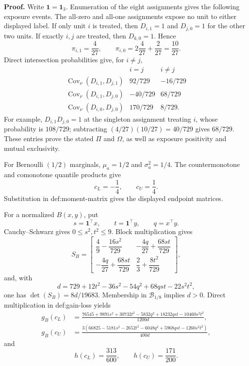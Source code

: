 \textbf{Proof.}
Write \(\mathbf1=\mathbf1_3\).  Enumeration of the eight assignments gives the following exposure events.  The all-zero and all-one assignments expose no unit to either displayed label.  If only unit \(i\) is treated, then \(D_{i,1}=1\) and \(D_{j,0}=1\) for the other two units.  If exactly \(i,j\) are treated, then \(D_{k,0}=1\).  Hence
\[
\pi_{i,1}=\frac4{27},
\qquad
\pi_{i,0}=2\frac4{27}+\frac2{27}=\frac{10}{27}.
\]
Direct intersection probabilities give, for \(i\ne j\),
\[
\begin{array}{c|cc}
&i=j&i\ne j\\ \hline
\operatorname{Cov}_{\nu}(D_{i,1},D_{j,1})&92/729&-16/729\\
\operatorname{Cov}_{\nu}(D_{i,1},D_{j,0})&-40/729&68/729\\
\operatorname{Cov}_{\nu}(D_{i,0},D_{j,0})&170/729&8/729.
\end{array}
\]
For example, \(D_{i,1}D_{j,0}=1\) at the singleton assignment treating \(i\), whose probability is \(108/729\); subtracting \((4/27)(10/27)=40/729\) gives \(68/729\).  These entries prove the stated \(\Pi\) and \(\Omega\), as well as exposure positivity and mutual exclusivity.

For Bernoulli \((1/2)\) marginals, \(\mu_a=1/2\) and \(\sigma_a^2=1/4\).  The countermonotone and comonotone quantile products give
\[
c_L=-\frac14,
\qquad
c_U=\frac14.
\]
Substitution in def:moment-matrix gives the displayed endpoint matrices.

For a normalized \(B(x,y)\), put
\[
s=\mathbf1^{\top}x,
\qquad
t=\mathbf1^{\top}y,
\qquad
q=x^{\top}y.
\]
Cauchy--Schwarz gives \(0\le s^2,t^2\le9\).  Block multiplication gives
\[
S_B=
\begin{bmatrix}
\dfrac49-\dfrac{16s^2}{729}&-\dfrac{4q}{27}+\dfrac{68st}{729}\\
-\dfrac{4q}{27}+\dfrac{68st}{729}&\dfrac23+\dfrac{8t^2}{729}
\end{bmatrix},
\]
and, with
\[
d=729+12t^2-36s^2-54q^2+68qst-22s^2t^2,
\]
one has \(\det(S_B)=8d/19683\).  Membership in \(\mathcal B_{1/8}\) implies \(d>0\).  Direct multiplication in def:gain-loss yields
\[
\begin{aligned}
g_B(c_L)
&=\frac{76545+9891s^2+30732t^2-5832q^2+18232qst-10460s^2t^2}{1200d},\\
g_B(c_U)
&=\frac{3(66825-5181s^2-2652t^2-6048q^2+5968qst-1260s^2t^2)}{400d},
\end{aligned}                                                       \tag{1}
\]
and
\[
h(c_L)=\frac{313}{600},
\qquad
h(c_U)=\frac{171}{200}.                                              \tag{2}
\]

